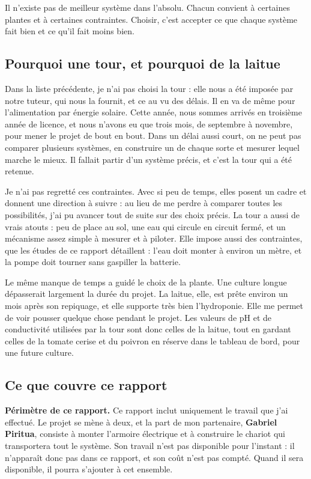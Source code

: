 \documentclass[11pt,a4paper]{article}
\begin{document}
\begin{aretenir}
Il n'existe pas de meilleur système dans l'absolu. Chacun convient à certaines plantes et à certaines contraintes. Choisir, c'est accepter ce que chaque système fait bien et ce qu'il fait moins bien.
\end{aretenir}

\subsection{Pourquoi une tour, et pourquoi de la laitue}

Dans la liste précédente, je n'ai pas choisi la tour : elle nous a été imposée par notre tuteur, qui nous la fournit, et ce au vu des délais. Il en va de même pour l'alimentation par énergie solaire. Cette année, nous sommes arrivés en troisième année de licence, et nous n'avons eu que trois mois, de septembre à novembre, pour mener le projet de bout en bout. Dans un délai aussi court, on ne peut pas comparer plusieurs systèmes, en construire un de chaque sorte et mesurer lequel marche le mieux. Il fallait partir d'un système précis, et c'est la tour qui a été retenue.

Je n'ai pas regretté ces contraintes. Avec si peu de temps, elles posent un cadre et donnent une direction à suivre : au lieu de me perdre à comparer toutes les possibilités, j'ai pu avancer tout de suite sur des choix précis. La tour a aussi de vrais atouts : peu de place au sol, une eau qui circule en circuit fermé, et un mécanisme assez simple à mesurer et à piloter. Elle impose aussi des contraintes, que les études de ce rapport détaillent : l'eau doit monter à environ un mètre, et la pompe doit tourner sans gaspiller la batterie.

Le même manque de temps a guidé le choix de la plante. Une culture longue dépasserait largement la durée du projet. La laitue, elle, est prête environ un mois après son repiquage, et elle supporte très bien l'hydroponie. Elle me permet de voir pousser quelque chose pendant le projet. Les valeurs de pH et de conductivité utilisées par la tour sont donc celles de la laitue, tout en gardant celles de la tomate cerise et du poivron en réserve dans le tableau de bord, pour une future culture.

\subsection{Ce que couvre ce rapport}

\textbf{Périmètre de ce rapport.} Ce rapport inclut uniquement le travail que j'ai effectué. Le projet se mène à deux, et la part de mon partenaire, \textbf{Gabriel Piritua}, consiste à monter l'armoire électrique et à construire le chariot qui transportera tout le système. Son travail n'est pas disponible pour l'instant : il n'apparaît donc pas dans ce rapport, et son coût n'est pas compté. Quand il sera disponible, il pourra s'ajouter à cet ensemble.
\end{document}
